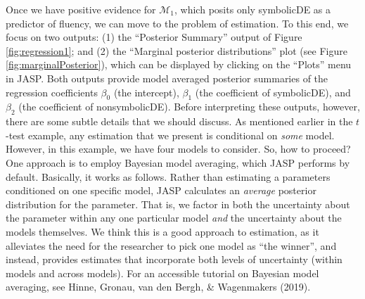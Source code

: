 \documentclass[english,,doc,floatsintext]{apa6}
\begin{document}
Once we have positive evidence for \(\mathcal{M}_{1}\), which posits only symbolicDE as a predictor of fluency, we can move to the problem of estimation. To this end, we focus on two outputs: (1) the \enquote{Posterior Summary} output of Figure \ref{fig:regression1}; and (2) the \enquote{Marginal posterior distributions} plot (see Figure \ref{fig:marginalPosterior}), which can be displayed by clicking on the \enquote{Plots} menu in JASP. Both outputs provide model averaged posterior summaries of the regression coefficients \(\beta_{0}\) (the intercept), \(\beta_{1}\) (the coefficient of symbolicDE), and \(\beta_{2}\) (the coefficient of nonsymbolicDE). Before interpreting these outputs, however, there are some subtle details that we should discuss. As mentioned earlier in the \(t\)-test example, any estimation that we present is conditional on \emph{some} model. However, in this example, we have four models to consider. So, how to proceed? One approach is to employ Bayesian model averaging, which JASP performs by default. Basically, it works as follows. Rather than estimating a parameters conditioned on one specific model, JASP calculates an \emph{average} posterior distribution for the parameter. That is, we factor in both the uncertainty about the parameter within any one particular model \emph{and} the uncertainty about the models themselves. We think this is a good approach to estimation, as it alleviates the need for the researcher to pick one model as \enquote{the winner}, and instead, provides estimates that incorporate both levels of uncertainty (within models and across models). For an accessible tutorial on Bayesian model averaging, see Hinne, Gronau, van den Bergh, \& Wagenmakers (2019).
\end{document}
